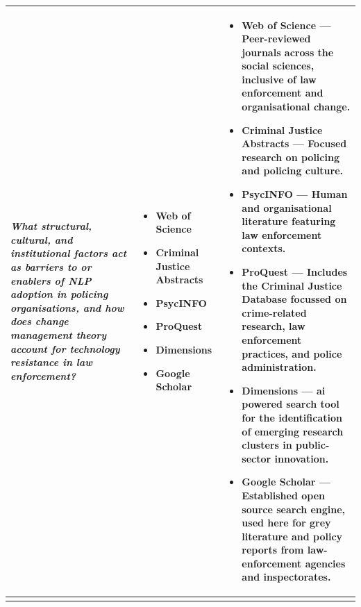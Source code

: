 \begin{longtable}{%
  >{\centering\arraybackslash}p{4.4cm}%
  >{\centering\arraybackslash}p{2.6cm}%
  >{\centering\arraybackslash}p{7.7cm}%
}
\textit{What structural, cultural, and institutional factors act as barriers to or
enablers of NLP adoption in policing organisations, and how does change management
theory account for technology resistance in law enforcement?} &
%
\begin{itemize}[leftmargin=*,nosep,topsep=2pt,partopsep=0pt,itemindent=0pt,align=left]
  \item Web of Science
  \item Criminal Justice Abstracts
  \item PsycINFO
  \item ProQuest
  \item Dimensions
  \item Google Scholar
\end{itemize} &
%
\begin{itemize}[leftmargin=*,nosep,topsep=2pt,partopsep=0pt,itemindent=0pt,align=left]
  \item \textbf{Web of Science} --- Peer-reviewed journals across the social sciences, inclusive of law enforcement and organisational change.
  \item \textbf{Criminal Justice Abstracts} --- Focused research on policing and policing culture.
  \item \textbf{PsycINFO} --- Human and organisational literature featuring law enforcement contexts.
  \item \textbf{ProQuest} --- Includes the Criminal Justice Database focussed on crime-related research, law enforcement practices, and police administration.
  \item \textbf{Dimensions} --- \gls{ai} powered search tool for the identification of emerging research clusters in public-sector innovation.
  \item \textbf{Google Scholar} --- Established open source search engine, used here for grey literature and policy reports from law-enforcement agencies and inspectorates.
\end{itemize} \\[8pt]

\midrule


\multicolumn{3}{c}{%
  \cellcolor{rowshade}\textcolor{track4}{%
    \textbf{Track 4 \textemdash{} Ethics, Law \& Governance}}}\\[2pt]


\end{longtable}
